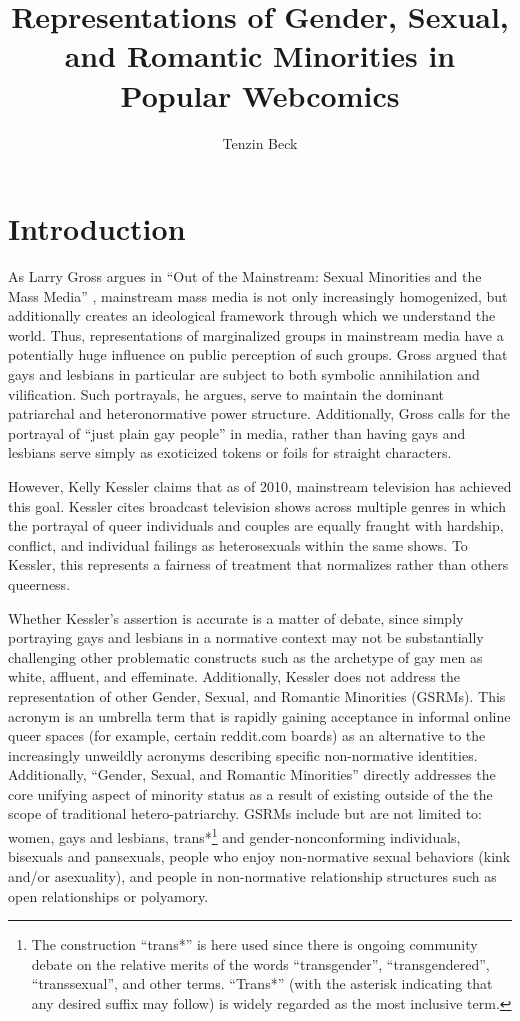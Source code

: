 \documentclass[man,12pt]{apa6}
\title{Representations of Gender, Sexual, and Romantic Minorities in Popular Webcomics}
\author{Tenzin Beck}
\affiliation{The University of New Mexico}
\begin{document}
\maketitle

\section{Introduction}
As Larry Gross  argues in ``Out of the Mainstream: Sexual Minorities and the Mass Media'' \citeyear{gross}, mainstream mass media is not only increasingly homogenized, but additionally creates an ideological framework through which we understand the world. Thus, representations of marginalized groups in mainstream media have a potentially huge influence on public perception of such groups. Gross argued that gays and lesbians in particular are subject to both symbolic annihilation and vilification. Such portrayals, he argues, serve to maintain the dominant patriarchal and heteronormative power structure. Additionally, Gross calls for the portrayal of ``just plain gay people'' in media, rather than having gays and lesbians serve simply as exoticized tokens or foils for straight characters.

However, Kelly Kessler \citeyear{queermediocrity} claims that as of 2010, mainstream television has achieved this goal. Kessler 
cites broadcast television shows across multiple genres in which the portrayal of queer individuals and couples are equally fraught with hardship, conflict, and individual failings as heterosexuals within the same shows. To Kessler, this represents a fairness of treatment that normalizes rather than others queerness. 

Whether Kessler's assertion is accurate is a matter of debate, since simply portraying gays and lesbians in a normative context may not be substantially challenging other problematic constructs such as the archetype of gay men as white, affluent, and effeminate. 
Additionally, Kessler does not address the representation of other Gender, Sexual, and Romantic Minorities (GSRMs). This acronym is an umbrella term that is rapidly gaining acceptance in informal online queer spaces (for example, certain reddit.com boards) as an alternative to the increasingly unweildly acronyms describing specific non-normative identities. Additionally, ``Gender, Sexual, and Romantic Minorities'' directly addresses the core unifying aspect of minority status as a result of existing outside of the the scope of traditional hetero-patriarchy. GSRMs include but are not limited to: women, gays and lesbians, trans*\footnote{The construction ``trans*'' is here used since there is ongoing community debate on the relative merits of the words ``transgender'', ``transgendered'', ``transsexual'', and other terms. ``Trans*'' (with the asterisk indicating that any desired suffix may follow) is widely regarded as the most inclusive term.} and gender-nonconforming individuals, bisexuals and pansexuals, people who enjoy non-normative sexual behaviors (kink and/or asexuality), and people in non-normative relationship structures such as open relationships or polyamory.
 
\end{document}
